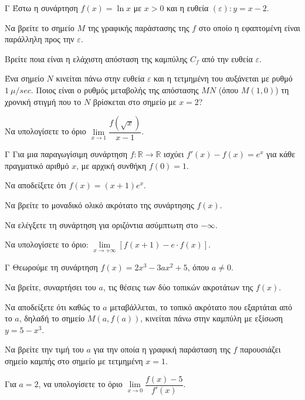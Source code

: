 \begin{thema}{Γ}
Έστω η συνάρτηση $f(x) = \ln x$ με $x > 0$ και η ευθεία $(\varepsilon): y = x - 2$.
\begin{erwthma}
  \item Να βρείτε το σημείο $M$ της γραφικής παράστασης της $f$ στο οποίο η εφαπτομένη είναι παράλληλη προς την $\varepsilon$. 
  \item Βρείτε ποια είναι η ελάχιστη απόσταση της καμπύλης $C_f$ από την ευθεία $\varepsilon$.
  \item Ένα σημείο $N$ κινείται πάνω στην ευθεία $\varepsilon$ και η τετμημένη του αυξάνεται με ρυθμό $1\ \mu/\si{sec}$. Ποιος είναι ο ρυθμός μεταβολής της απόστασης $MN$ (όπου $M(1,0)$) τη χρονική στιγμή που το $N$ βρίσκεται στο σημείο με $x=2$?
  \item Να υπολογίσετε το όριο $\lim\limits_{x \to 1} \dfrac{f(\sqrt{x})}{x-1}$.
\end{erwthma}
\end{thema}

\begin{thema}{Γ}
Για μια παραγωγίσιμη συνάρτηση $f: \mathbb{R} \to \mathbb{R}$ ισχύει $f'(x) - f(x) = e^x$ για κάθε πραγματικό αριθμό $x$, με αρχική συνθήκη $f(0) = 1$.
\begin{erwthma}
  \item Να αποδείξετε ότι $f(x) = (x+1)e^x$.
  \item Να βρείτε το μοναδικό ολικό ακρότατο της συνάρτησης $f(x)$.
  \item Να ελέγξετε τη συνάρτηση για οριζόντια ασύμπτωτη στο $-\infty$.
  \item Να υπολογίσετε το όριο: $\lim\limits_{x \to +\infty} \left[ f(x+1) - e \cdot f(x) \right]$.
\end{erwthma}
\end{thema}

\begin{thema}{Γ}
Θεωρούμε τη συνάρτηση $f(x) = 2x^3 - 3a x^2 + 5$, όπου $a \ne 0$.
\begin{erwthma}
  \item Να βρείτε, συναρτήσει του $a$, τις θέσεις των δύο τοπικών ακροτάτων της $f(x)$.
  \item Να αποδείξετε ότι καθώς το $a$ μεταβάλλεται, το τοπικό ακρότατο που εξαρτάται από το $a$, δηλαδή το σημείο $M(a, f(a))$, κινείται πάνω στην καμπύλη με εξίσωση $y = 5 - x^3$.
  \item Να βρείτε την τιμή του $a$ για την οποία η γραφική παράσταση της $f$ παρουσιάζει σημείο καμπής στο σημείο με τετμημένη $x=1$.
  \item Για $a = 2$, να υπολογίσετε το όριο $\lim\limits_{x \to 0} \dfrac{f(x) - 5}{f'(x)}$.
\end{erwthma}
\end{thema}

